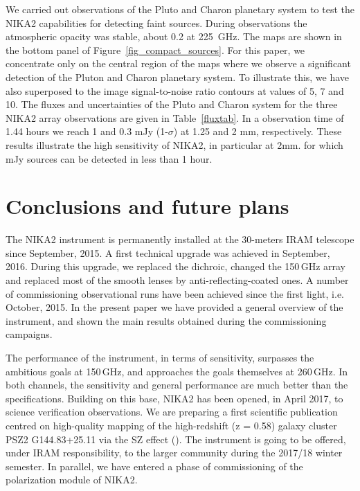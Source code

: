 \documentclass[]{aa} %
\begin{document}
We carried out observations of the Pluto and Charon planetary system to test the NIKA2 capabilities for detecting faint sources. 
During observations the atmospheric opacity was stable, about 0.2 at 225~GHz.
The maps are shown in the bottom panel of Figure~\ref{fig_compact_sources}. For this paper, we concentrate only on the central region of the maps where we observe a significant detection of the Pluton and Charon planetary system. To illustrate this, we have also superposed to the image signal-to-noise ratio contours at values of 5, 7 and 10. The fluxes and uncertainties of the Pluto and Charon system for the three NIKA2 array observations are given in Table~\ref{fluxtab}. In a observation time of 1.44 hours we reach 1 and 0.3 mJy (1-$\sigma$) at 1.25 and 2 mm, respectively.
These results illustrate the high sensitivity of NIKA2, in particular at 2mm. for which mJy sources can be detected in less than 1 hour.



%
%





\section{Conclusions and future plans}

The NIKA2 instrument is permanently installed at the 30-meters IRAM telescope since September, 2015. A first technical upgrade was achieved in September, 2016. During this upgrade, we replaced the dichroic, changed the 150\,GHz array and replaced most of the smooth lenses by anti-reflecting-coated ones. A number of commissioning observational runs have been achieved since the first light, i.e. October, 2015. In the present paper we have provided a general overview of the instrument, and shown the main results obtained during the commissioning campaigns. 

The performance of the instrument, in terms of sensitivity, surpasses the ambitious goals at 150\,GHz, and approaches the goals themselves at 260\,GHz. In both channels, the sensitivity and general performance are much better than the specifications. 
Building on this base, NIKA2 has been opened, in April 2017, to science verification observations. We are preparing a first scientific publication centred on high-quality mapping of the high-redshift (z = 0.58) galaxy cluster PSZ2 G144.83+25.11 via the SZ effect (\cite{Ruppin2017}). The instrument is going to be offered, under IRAM responsibility, to the larger community during the 2017/18 winter semester. In parallel, we have entered a phase of commissioning of the polarization module of NIKA2. 
\end{document}
